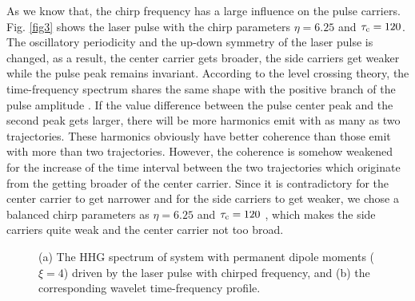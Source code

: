 \documentclass[10pt,letterpaper]{article}
\begin{document}
As we know that, the chirp frequency has a large influence on the pulse carriers. Fig. \ref{fig3} shows the laser pulse with the chirp parameters $ \eta=6.25 $ and $ \tau_{\rm{c}}=120$. The oscillatory periodicity and the up-down symmetry of the laser pulse is changed, as a result, the center carrier gets broader, the side carriers get weaker while the pulse peak remains invariant. According to the level crossing theory, the time-frequency spectrum shares the same shape with the positive branch of the pulse amplitude \cite{WANG-ZHONG-YANG-Two-Level-Attosecond-generation-1999}. If the value difference between the pulse center peak and the second peak gets larger, there will be more harmonics emit with as many as two trajectories. These harmonics obviously have better coherence than those emit with more than two trajectories. However, the coherence is somehow weakened for the increase of the time interval between the two trajectories which originate from the getting broader of the center carrier. Since it is contradictory for the center carrier to get narrower and for the side carriers to get weaker, we chose a balanced chirp parameters as  $ \eta=6.25 $ and $ \tau_{\rm{c}}=120 $ , which makes the side carriers quite weak and the center carrier not too broad. 

\begin{figure}[!htbp]
	\centering
	\caption{(a) The HHG spectrum of system with permanent dipole moments ($ \xi=4 $) driven by the laser pulse with chirped frequency, and (b) the corresponding wavelet time-frequency profile.}
	\label{fig4}
\end{figure}
\end{document}
